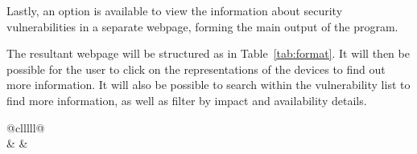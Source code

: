 Lastly, an option is available to view the information about security
vulnerabilities in a separate webpage, forming the main output of the
program.

The resultant webpage will be structured as in Table~\ref{tab:format}.  It
will then be possible for the user to click on the representations of the
devices to find out more information.  It will also be possible to search
within the vulnerability list to find more information, as well as filter by
impact and availability details.

  \begin{table}[] \centering \begin{tabular}{@{}clllll@{}} \toprule
                                                                                                                                                                                                                                          \\
    \midrule {} &  &  \\
    \midrule
                                                                                                                                                                                                    \\
    \midrule
                                                                                                                                                                                      \\
    \midrule
                                                      \\
    \midrule
                                                                                                                                                                                                                \\
    \bottomrule \end{tabular} \caption{Format of presented data found in e-mail
    header}\label{tab:format} \end{table}

